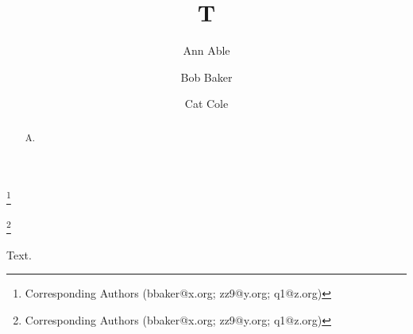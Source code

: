 \documentclass[aps,prl,superscriptaddress]{revtex4-2}
\begin{document}
\title{T}
\author{Ann Able}
\author{Bob Baker}
\thanks{Corresponding Authors (bbaker@x.org; zz9@y.org; q1@z.org)}
\author{Cat Cole}
\thanks{Corresponding Authors (bbaker@x.org; zz9@y.org; q1@z.org)}
\begin{abstract}
A.
\end{abstract}
\maketitle
Text.
\end{document}
